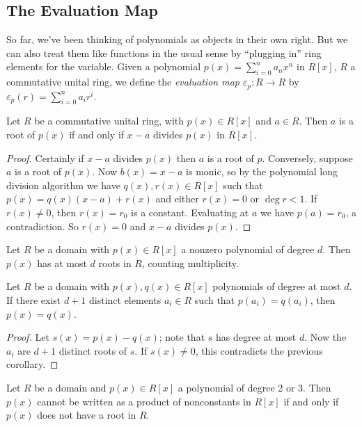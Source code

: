 \documentclass{article}
\begin{document}
\subsection*{The Evaluation Map}

So far, we've been thinking of polynomials as objects in their own right. But we can also treat them like functions in the usual sense by ``plugging in'' ring elements for the variable. Given a polynomial $p(x) = \sum_{i=0}^n a_nx^n$ in $R[x]$, $R$ a commutative unital ring, we define the \emph{evaluation map} $\varepsilon_p : R \rightarrow R$ by $\varepsilon_p(r) = \sum_{i=0}^n a_i r^i$.

\begin{prop}
Let $R$ be a commutative unital ring, with $p(x) \in R[x]$ and $a \in R$. Then $a$ is a root of $p(x)$ if and only if $x-a$ divides $p(x)$ in $R[x]$.
\end{prop}

\begin{proof}
Certainly if $x-a$ divides $p(x)$ then $a$ is a root of $p$. Conversely, suppose $a$ is a root of $p(x)$. Now $b(x) = x - a$ is monic, so by the polynomial long division algorithm we have $q(x), r(x) \in R[x]$ such that $p(x) = q(x)(x-a) + r(x)$ and either $r(x) = 0$ or $\deg{r} < 1$. If $r(x) \neq 0$, then $r(x) = r_0$ is a constant. Evaluating at $a$ we have $p(a) = r_0$, a contradiction. So $r(x) = 0$ and $x-a$ divides $p(x)$.
\end{proof}

\begin{cor}
Let $R$ be a domain with $p(x) \in R[x]$ a nonzero polynomial of degree $d$. Then $p(x)$ has at most $d$ roots in $R$, counting multiplicity.
\end{cor}

\begin{cor}
Let $R$ be a domain with $p(x), q(x) \in R[x]$ polynomials of degree at most $d$. If there exist $d+1$ distinct elements $a_i \in R$ such that $p(a_i) = q(a_i)$, then $p(x) = q(x)$.
\end{cor}

\begin{proof}
Let $s(x) = p(x) - q(x)$; note that $s$ has degree at most $d$. Now the $a_i$ are $d+1$ distinct roots of $s$. If $s(x) \neq 0$, this contradicts the previous corollary.
\end{proof}

\begin{prop}
Let $R$ be a domain and $p(x) \in R[x]$ a polynomial of degree 2 or 3. Then $p(x)$ cannot be written as a product of nonconstants in $R[x]$ if and only if $p(x)$ does not have a root in $R$.
\end{prop}
\end{document}
